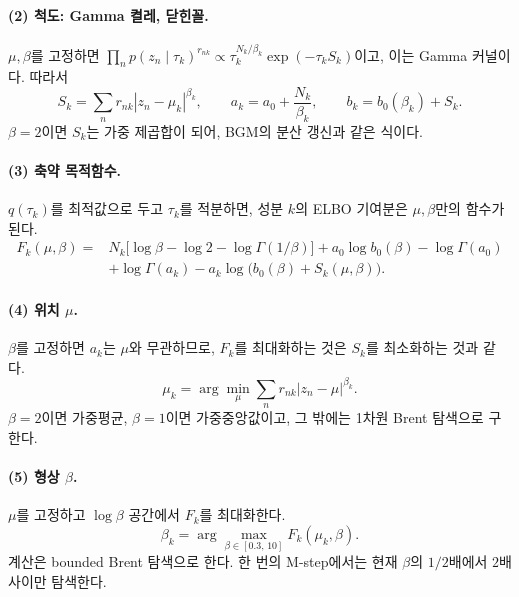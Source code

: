 \documentclass[11pt]{article}
\begin{document}
\paragraph{(2) 척도: Gamma 켤레, 닫힌꼴.}
$\mu,\beta$를 고정하면 $\prod_n p(z_n\mid\tau_k)^{r_{nk}}\propto\tau_k^{N_k/\beta_k}\exp(-\tau_kS_k)$이고, 이는 Gamma 커널이다. 따라서
\begin{equation}\label{eq:S}
  S_k=\sum_n r_{nk}|z_n-\mu_k|^{\beta_k},\qquad a_k=a_0+\frac{N_k}{\beta_k},\qquad b_k=b_0(\beta_k)+S_k.
\end{equation}
$\beta=2$이면 $S_k$는 가중 제곱합이 되어, BGM의 분산 갱신과 같은 식이다.

\paragraph{(3) 축약 목적함수.}
$q(\tau_k)$를 최적값으로 두고 $\tau_k$를 적분하면, 성분 $k$의 ELBO 기여분은 $\mu,\beta$만의 함수가 된다.
\begin{equation}\label{eq:F}
\begin{split}
  F_k(\mu,\beta)={}&N_k\big[\log\beta-\log2-\log\Gamma(1/\beta)\big]+a_0\log b_0(\beta)-\log\Gamma(a_0)\\
  &+\log\Gamma(a_k)-a_k\log\big(b_0(\beta)+S_k(\mu,\beta)\big).
\end{split}
\end{equation}

\paragraph{(4) 위치 $\mu$.}
$\beta$를 고정하면 $a_k$는 $\mu$와 무관하므로, $F_k$를 최대화하는 것은 $S_k$를 최소화하는 것과 같다.
\begin{equation}
  \mu_k=\arg\min_{\mu}\sum_n r_{nk}|z_n-\mu|^{\beta_k}.
\end{equation}
$\beta=2$이면 가중평균, $\beta=1$이면 가중중앙값이고, 그 밖에는 1차원 Brent 탐색으로 구한다.

\paragraph{(5) 형상 $\beta$.}
$\mu$를 고정하고 $\log\beta$ 공간에서 $F_k$를 최대화한다.
\begin{equation}
  \beta_k=\arg\max_{\beta\in[0.3,\,10]}F_k(\mu_k,\beta).
\end{equation}
계산은 bounded Brent 탐색으로 한다. 한 번의 M-step에서는 현재 $\beta$의 $1/2$배에서 $2$배 사이만 탐색한다.
\end{document}
